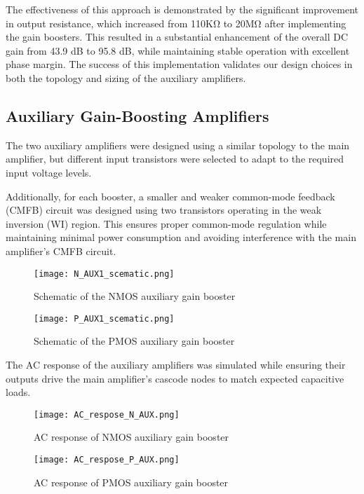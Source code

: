 \documentclass[a4paper,12pt]{article}
\begin{document}
The effectiveness of this approach is demonstrated by the significant improvement in output resistance, which increased from 110KΩ to 20MΩ after implementing the gain boosters. This resulted in a substantial enhancement of the overall DC gain from 43.9 dB to 95.8 dB, while maintaining stable operation with excellent phase margin. The success of this implementation validates our design choices in both the topology and sizing of the auxiliary amplifiers.


\subsection{Auxiliary Gain-Boosting Amplifiers}
The two auxiliary amplifiers were designed using a similar topology to the main amplifier, but different input transistors were selected to adapt to the required input voltage levels.

Additionally, for each booster, a smaller and weaker common-mode feedback (CMFB) circuit was designed using two transistors operating in the weak inversion (WI) region. This ensures proper common-mode regulation while maintaining minimal power consumption and avoiding interference with the main amplifier’s CMFB circuit.

\begin{figure}[h]
    \centering
    \texttt{[image: N\_AUX1\_scematic.png]}
    \caption{Schematic of the NMOS auxiliary gain booster}
    \label{fig:n_aux}
\end{figure}

\begin{figure}[h]
    \centering
    \texttt{[image: P\_AUX1\_scematic.png]}
    \caption{Schematic of the PMOS auxiliary gain booster}
    \label{fig:p_aux}
\end{figure}

The AC response of the auxiliary amplifiers was simulated while ensuring their outputs drive the main amplifier’s cascode nodes to match expected capacitive loads.

\begin{figure}[H]
    \centering
    \texttt{[image: AC\_respose\_N\_AUX.png]}
    \caption{AC response of NMOS auxiliary gain booster}
    \label{fig:ac_n_aux}
\end{figure}

\begin{figure}[H]
    \centering
    \texttt{[image: AC\_respose\_P\_AUX.png]}
    \caption{AC response of PMOS auxiliary gain booster}
    \label{fig:ac_p_aux}
\end{figure}
\end{document}
